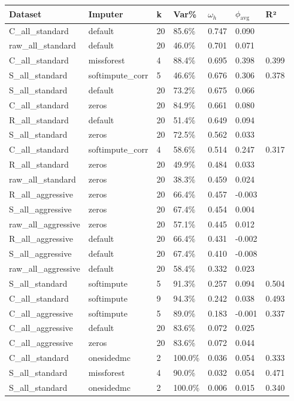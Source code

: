 \documentclass{article} %
\begin{document}
\begin{longtable}[]{@{}lllllll@{}}
\toprule\noalign{}
Dataset & Imputer & k & Var\% & \(\omega_h\) & \(\phi_{\text{avg}}\) & R² \\
\midrule\noalign{}
\endhead
\bottomrule\noalign{}
\endlastfoot
C\_all\_standard & default & 20 & 85.6\% & 0.747 & 0.090 & \\
raw\_all\_standard & default & 20 & 46.0\% & 0.701 & 0.071 & \\
C\_all\_standard & missforest & 4 & 88.4\% & 0.695 & 0.398 & 0.399 \\
S\_all\_standard & softimpute\_corr & 5 & 46.6\% & 0.676 & 0.306 & 0.378 \\
S\_all\_standard & default & 20 & 73.2\% & 0.675 & 0.066 & \\
C\_all\_standard & zeros & 20 & 84.9\% & 0.661 & 0.080 & \\
R\_all\_standard & default & 20 & 51.4\% & 0.649 & 0.094 & \\
S\_all\_standard & zeros & 20 & 72.5\% & 0.562 & 0.033 & \\
C\_all\_standard & softimpute\_corr & 4 & 58.6\% & 0.514 & 0.247 & 0.317 \\
R\_all\_standard & zeros & 20 & 49.9\% & 0.484 & 0.033 & \\
raw\_all\_standard & zeros & 20 & 38.3\% & 0.459 & 0.024 & \\
R\_all\_aggressive & zeros & 20 & 66.4\% & 0.457 & -0.003 & \\
S\_all\_aggressive & zeros & 20 & 67.4\% & 0.454 & 0.004 & \\
raw\_all\_aggressive & zeros & 20 & 57.1\% & 0.445 & 0.012 & \\
R\_all\_aggressive & default & 20 & 66.4\% & 0.431 & -0.002 & \\
S\_all\_aggressive & default & 20 & 67.4\% & 0.410 & -0.008 & \\
raw\_all\_aggressive & default & 20 & 58.4\% & 0.332 & 0.023 & \\
S\_all\_standard & softimpute & 5 & 91.3\% & 0.257 & 0.094 & 0.504 \\
C\_all\_standard & softimpute & 9 & 94.3\% & 0.242 & 0.038 & 0.493 \\
C\_all\_aggressive & softimpute & 5 & 89.0\% & 0.183 & -0.001 & 0.337 \\
C\_all\_aggressive & default & 20 & 83.6\% & 0.072 & 0.025 & \\
C\_all\_aggressive & zeros & 20 & 83.6\% & 0.072 & 0.044 & \\
C\_all\_standard & onesidedmc & 2 & 100.0\% & 0.036 & 0.054 & 0.333 \\
S\_all\_standard & missforest & 4 & 90.0\% & 0.032 & 0.054 & 0.471 \\
S\_all\_standard & onesidedmc & 2 & 100.0\% & 0.006 & 0.015 & 0.340 \\
\end{longtable}
\end{document}

